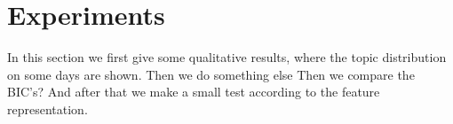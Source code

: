 \documentclass[11pt,a4paper]{article}
\begin{document}
% 

\pagebreak

\section{Experiments}
\label{sec:Experiments}
In this section we first give some qualitative results, where the topic distribution on some days are shown. 
Then we do something else
Then we compare the BIC's?
And after that we make a small test according to the feature representation.


\end{document}
